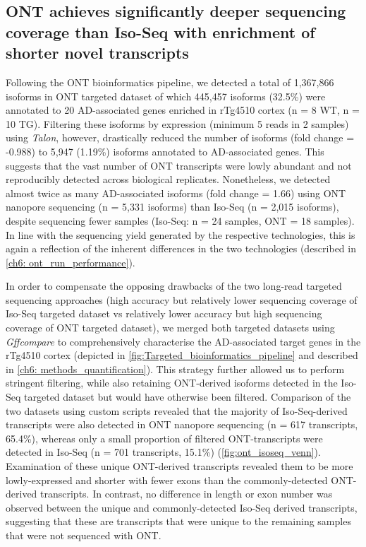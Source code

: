 \clearpage
\subsection{ONT achieves significantly deeper sequencing coverage than Iso-Seq with enrichment of shorter novel transcripts}
Following the ONT bioinformatics pipeline, we detected a total of 1,367,866 isoforms in ONT targeted dataset of which 445,457 isoforms (32.5\%) were annotated to 20 AD-associated genes enriched in rTg4510 cortex (n = 8 WT, n = 10 TG). Filtering these isoforms by expression (minimum 5 reads in 2 samples) using \textit{Talon}, however, drastically reduced the number of isoforms (fold change = -0.988) to 5,947 (1.19\%) isoforms annotated to AD-associated genes. This suggests that the vast number of ONT transcripts were lowly abundant and not reproducibly detected across biological replicates. Nonetheless, we detected almost twice as many AD-associated isoforms (fold change = 1.66) using ONT nanopore sequencing (n = 5,331 isoforms) than Iso-Seq (n = 2,015 isoforms), despite sequencing fewer samples (Iso-Seq: n = 24 samples, ONT = 18 samples). In line with the sequencing yield generated by the respective technologies, this is again a reflection of the inherent differences in the two technologies (described in \cref{ch6: ont_run_performance}). 

In order to compensate the opposing drawbacks of the two long-read targeted sequencing approaches (high accuracy but relatively lower sequencing coverage of Iso-Seq targeted dataset vs relatively lower accuracy but high sequencing coverage of ONT targeted dataset), we merged both targeted datasets using \textit{Gffcompare} to comprehensively characterise the AD-associated target genes in the rTg4510 cortex (depicted in \cref{fig:Targeted_bioinformatics_pipeline} and described in \cref{ch6: methods_quantification}). This strategy further allowed us to perform stringent filtering, while also retaining ONT-derived isoforms detected in the Iso-Seq targeted dataset but would have otherwise been filtered. Comparison of the two datasets using custom scripts revealed that the majority of Iso-Seq-derived transcripts were also detected in ONT nanopore sequencing (n = 617 transcripts, 65.4\%), whereas only a small proportion of filtered ONT-transcripts were detected in Iso-Seq (n = 701 transcripts, 15.1\%) (\cref{fig:ont_isoseq_venn}). Examination of these unique ONT-derived transcripts revealed them to be more lowly-expressed and shorter with fewer exons than the commonly-detected ONT-derived transcripts. In contrast, no difference in length or exon number was observed between the unique and commonly-detected Iso-Seq derived transcripts, suggesting that these are transcripts that were unique to the remaining samples that were not sequenced with ONT. 

